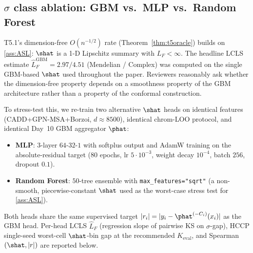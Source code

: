 
\subsection{$\hat\sigma$ class ablation: GBM vs.\ MLP vs.\ Random Forest}
\label{app:tables:sigma_ablation}

T5.1's dimension-free $O(n^{-1/2})$ rate (Theorem~\ref{thm:t5oracle})
builds on \ref{ass:ASL}: $\shat$ is a 1-D Lipschitz summary with
$L_F < \infty$. The headline LCLS estimate $\hat L_F^{\mathrm{GBM}} = 2.97 / 4.51$
(Mendelian / Complex) was computed on the single GBM-based $\shat$ used
throughout the paper. Reviewers reasonably ask whether the dimension-free
property depends on a smoothness property of the GBM architecture rather
than a property of the conformal construction.

To stress-test this, we re-train two alternative $\shat$ heads on identical
features (CADD+GPN-MSA+Borzoi, $d \approx 8500$), identical chrom-LOO
protocol, and identical Day~10 GBM aggregator $\phat$:
\begin{itemize}
\item \textbf{MLP}: 3-layer $64\text{-}32\text{-}1$ with softplus output and
AdamW training on the absolute-residual target ($80$ epochs, lr $5{\cdot}10^{-3}$,
weight decay $10^{-4}$, batch $256$, dropout $0.1$).
\item \textbf{Random Forest}: $50$-tree ensemble with
\texttt{max\_features="sqrt"} (a non-smooth, piecewise-constant $\shat$ used
as the worst-case stress test for \ref{ass:ASL}).
\end{itemize}
Both heads share the same supervised target $|r_i| = |y_i - \phat^{(-C_i)}(x_i)|$
as the GBM head. Per-head LCLS $\hat L_F$ (regression slope of pairwise KS
on $\sigma$-gap), HCCP single-seed worst-cell $\shat$-bin gap at the
recommended $K_{\mathrm{eval}}$, and Spearman$(\shat, |r|)$ are reported below.

